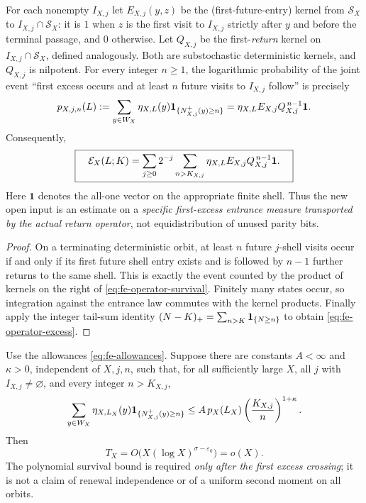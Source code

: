 \begin{proposition}
\label{prop:fe-shell-transport}
For each nonempty $I_{X,j}$ let $E_{X,j}(y,z)$ be the
(first-future-entry) kernel from $\mathcal S_X$ to
$I_{X,j}\cap\mathcal S_X$: it is $1$ when $z$ is the first visit to
$I_{X,j}$ strictly after $y$ and before the terminal passage, and
$0$ otherwise.  Let $Q_{X,j}$ be the first-\emph{return} kernel on
$I_{X,j}\cap\mathcal S_X$, defined analogously.  Both are
substochastic deterministic kernels, and $Q_{X,j}$ is nilpotent.
For every integer $n\ge1$, the logarithmic probability of the joint
event ``first excess occurs and at least $n$ future visits to
$I_{X,j}$ follow'' is precisely
\begin{equation}\label{eq:fe-operator-survival}
 p_{X,j,n}(L)
 :=\sum_{y\in W_X}\eta_{X,L}(y)
       {\bf1}_{\{N^+_{X,j}(y)\ge n\}}
 =\eta_{X,L}E_{X,j}Q_{X,j}^{\,n-1}{\bf1}.
\end{equation}
Consequently,
\begin{equation}\label{eq:fe-operator-excess}
 \boxed{\quad
 \mathcal E_X(L;K)=\sum_{j\ge0}2^{-j}
      \sum_{n>K_{X,j}}
          \eta_{X,L}E_{X,j}Q_{X,j}^{\,n-1}{\bf1}.
 \quad}
\end{equation}
Here $\mathbf1$ denotes the all-one vector on the appropriate
finite shell. Thus the new open input is an estimate on a
\emph{specific first-excess entrance measure transported by the
actual return operator}, not equidistribution of unused parity bits.
\end{proposition}
\begin{proof}
On a terminating deterministic orbit, at least $n$ future
$j$-shell visits occur if and only if its first future shell entry
exists and is followed by $n-1$ further returns to the same shell.
This is exactly the event counted by the product of kernels on the
right of \eqref{eq:fe-operator-survival}.  Finitely many states occur,
so integration against the entrance law commutes with the kernel
products.  Finally apply the integer tail-sum identity
$(N-K)_+=\sum_{n>K}{\bf1}_{\{N\ge n\}}$ to obtain
\eqref{eq:fe-operator-excess}.
\end{proof}

\begin{corollary}
\label{cor:fe-polynomial}
Use the allowances \eqref{eq:fe-allowances}. Suppose there are
constants $A<\infty$ and $\kappa>0$, independent of $X,j,n$, such
that, for all sufficiently large $X$, all $j$ with $I_{X,j}\ne\varnothing$,
and every integer $n>K_{X,j}$,
\begin{equation}\label{eq:fe-polynomial-assumption}
 \sum_{y\in W_X}\eta_{X,L_X}(y)
        {\bf1}_{\{N^+_{X,j}(y)\ge n\}}
 \le A\,p_X(L_X)\left(\frac{K_{X,j}}n\right)^{1+\kappa}.
\end{equation}
Then
\[
 T_X=O\bigl(X(\log X)^{\sigma-\varepsilon_0}\bigr)=o(X).
\]
The polynomial survival bound is required \emph{only after the first
excess crossing}; it is not a claim of renewal independence or of a
uniform second moment on all orbits.
\end{corollary}

